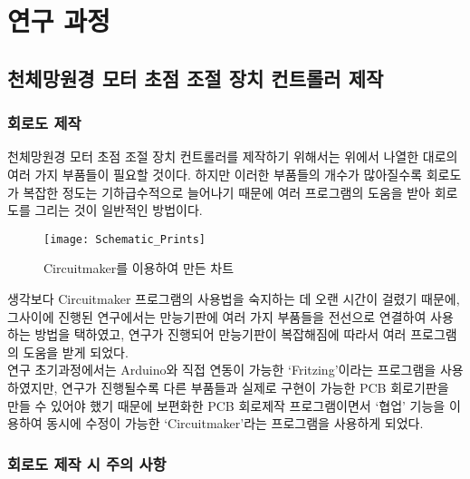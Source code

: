 \section{연구 과정}

\subsection{천체망원경 모터 초점 조절 장치 컨트롤러 제작}

\subsubsection{회로도 제작}

천체망원경 모터 초점 조절 장치 컨트롤러를 제작하기 위해서는 위에서 나열한 대로의 여러 가지 부품들이 필요할 것이다. 하지만 이러한 부품들의 개수가 많아질수록 회로도가 복잡한 정도는 기하급수적으로 늘어나기 때문에 여러 프로그램의 도움을 받아 회로도를 그리는 것이 일반적인 방법이다.
\begin{wrapfigure}{l}{0.5\textwidth}
	\texttt{[image: Schematic\_Prints]}
	\caption{Circuitmaker를 이용하여 만든 차트}
	\label{fig:Schematic_Prints}
\end{wrapfigure}
생각보다 Circuitmaker 프로그램의 사용법을 숙지하는 데 오랜 시간이 걸렸기 때문에, 그사이에 진행된 연구에서는 만능기판에 여러 가지 부품들을 전선으로 연결하여 사용하는 방법을 택하였고, 연구가 진행되어 만능기판이 복잡해짐에 따라서 여러 프로그램의 도움을 받게 되었다.\\
연구 초기과정에서는 Arduino와 직접 연동이 가능한 ‘Fritzing’이라는 프로그램을 사용하였지만, 연구가 진행될수록 다른 부품들과 실제로 구현이 가능한 PCB 회로기판을 만들 수 있어야 했기 때문에 보편화한 PCB 회로제작 프로그램이면서 ‘협업’ 기능을 이용하여 동시에 수정이 가능한 ‘Circuitmaker’라는 프로그램을 사용하게 되었다.

\subsubsection{회로도 제작 시 주의 사항}


